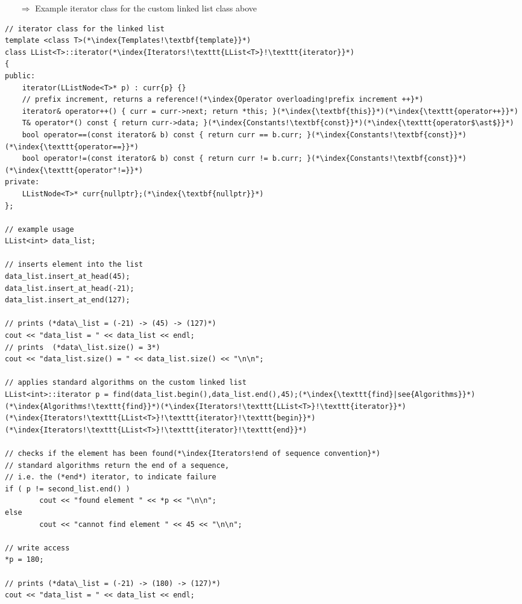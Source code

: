 \documentclass[10pt]{article}
\begin{document}
\begin{enumerate}
\item[$\Rightarrow$] Example iterator class for the custom linked list class above
\end{enumerate}
\begin{lstlisting}
// iterator class for the linked list
template <class T>(*\index{Templates!\textbf{template}}*)
class LList<T>::iterator(*\index{Iterators!\texttt{LList<T>}!\texttt{iterator}}*)
{
public:
    iterator(LListNode<T>* p) : curr{p} {}
    // prefix increment, returns a reference!(*\index{Operator overloading!prefix increment ++}*)
    iterator& operator++() { curr = curr->next; return *this; }(*\index{\textbf{this}}*)(*\index{\texttt{operator++}}*)
    T& operator*() const { return curr->data; }(*\index{Constants!\textbf{const}}*)(*\index{\texttt{operator$\ast$}}*)
    bool operator==(const iterator& b) const { return curr == b.curr; }(*\index{Constants!\textbf{const}}*)(*\index{\texttt{operator==}}*)
    bool operator!=(const iterator& b) const { return curr != b.curr; }(*\index{Constants!\textbf{const}}*)(*\index{\texttt{operator"!=}}*)
private:
    LListNode<T>* curr{nullptr};(*\index{\textbf{nullptr}}*)
};

// example usage
LList<int> data_list;

// inserts element into the list
data_list.insert_at_head(45);
data_list.insert_at_head(-21);
data_list.insert_at_end(127);

// prints (*data\_list = (-21) -> (45) -> (127)*)
cout << "data_list = " << data_list << endl;
// prints  (*data\_list.size() = 3*)
cout << "data_list.size() = " << data_list.size() << "\n\n";

// applies standard algorithms on the custom linked list
LList<int>::iterator p = find(data_list.begin(),data_list.end(),45);(*\index{\texttt{find}|see{Algorithms}}*)(*\index{Algorithms!\texttt{find}}*)(*\index{Iterators!\texttt{LList<T>}!\texttt{iterator}}*)(*\index{Iterators!\texttt{LList<T>}!\texttt{iterator}!\texttt{begin}}*)(*\index{Iterators!\texttt{LList<T>}!\texttt{iterator}!\texttt{end}}*)

// checks if the element has been found(*\index{Iterators!end of sequence convention}*)
// standard algorithms return the end of a sequence, 
// i.e. the (*end*) iterator, to indicate failure
if ( p != second_list.end() )
        cout << "found element " << *p << "\n\n";
else
        cout << "cannot find element " << 45 << "\n\n";

// write access
*p = 180;

// prints (*data\_list = (-21) -> (180) -> (127)*)
cout << "data_list = " << data_list << endl;
\end{lstlisting}
%
%
\end{document}
